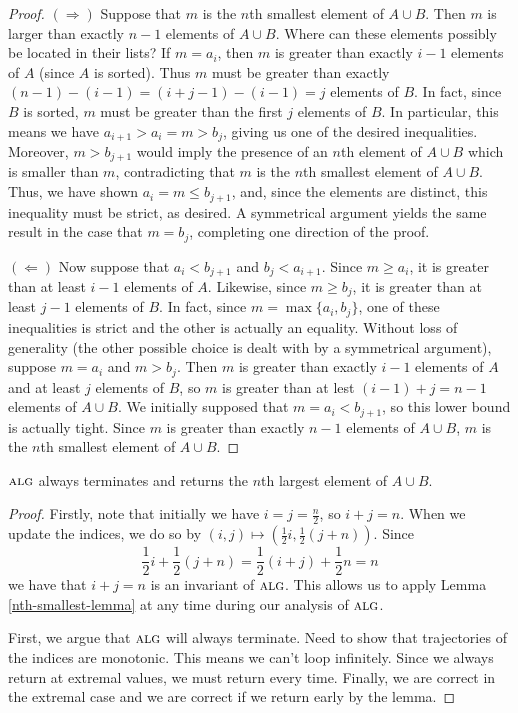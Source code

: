 \documentclass[11pt]{article}
\newcommand{\alg}{\textsc{alg}}
\begin{document}
\begin{proof}
  $(\Rightarrow)$ Suppose that $m$ is the $n$th smallest element of $A \cup B$.
  Then $m$ is larger than exactly $n - 1$ elements of $A \cup B$.
  Where can these elements possibly be located in their lists?
  If $m = a_i$, then $m$ is greater than exactly $i - 1$ elements of $A$ (since $A$ is sorted).
  Thus $m$ must be greater than exactly $(n - 1) - (i - 1) = (i + j - 1) - (i - 1) = j$ elements of $B$.
  In fact, since $B$ is sorted, $m$ must be greater than the first $j$ elements of $B$.
  In particular, this means we have $a_{i + 1} > a_i = m > b_j$, giving us one of the desired inequalities.
  Moreover, $m > b_{j+1}$ would imply the presence of an $n$th element of $A \cup B$ which is smaller than $m$, contradicting that $m$ is the $n$th smallest element of $A \cup B$.
  Thus, we have shown $a_i = m \leq b_{j+1}$, and, since the elements are distinct, this inequality must be strict, as desired.
  A symmetrical argument yields the same result in the case that $m = b_j$, completing one direction of the proof.

  $(\Leftarrow)$ Now suppose that $a_i < b_{j+1}$ and $b_j < a_{i+1}$.
  Since $m \geq a_i$, it is greater than at least $i - 1$ elements of $A$.
  Likewise, since $m \geq b_j$, it is greater than at least $j - 1$ elements of $B$.
  In fact, since $m = \max\{a_i, b_j\}$, one of these inequalities is strict and the other is actually an equality.
  Without loss of generality (the other possible choice is dealt with by a symmetrical argument), suppose $m = a_i$ and $m > b_j$.
  Then $m$ is greater than exactly $i - 1$ elements of $A$ and at least $j$ elements of $B$, so $m$ is greater than at lest $(i - 1) + j = n - 1$ elements of $A \cup B$.
  We initially supposed that $m = a_i < b_{j+1}$, so this lower bound is actually tight.
  Since $m$ is greater than exactly $n - 1$ elements of $A \cup B$, $m$ is the $n$th smallest element of $A \cup B$.
\end{proof}

 $\alg$ always terminates and returns the $n$th largest element of $A \cup B$.

\begin{proof}
  Firstly, note that initially we have $i = j = \frac{n}{2}$, so $i + j = n$.
  When we update the indices, we do so by $(i, j) \mapsto \left(\frac{1}{2}i, \frac{1}{2}(j + n)\right)$.
  Since \[\frac{1}{2}i + \frac{1}{2}(j + n) = \frac{1}{2}(i + j) + \frac{1}{2}n = n\] we have that $i + j = n$ is an invariant of $\alg$.
  This allows us to apply Lemma \ref{nth-smallest-lemma} at any time during our analysis of $\alg$.

  First, we argue that $\alg$ will always terminate.
  Need to show that trajectories of the indices are monotonic.
  This means we can't loop infinitely.
  Since we always return at extremal values, we must return every time.
  Finally, we are correct in the extremal case and we are correct if we return early by the lemma.
\end{proof}
\end{document}
